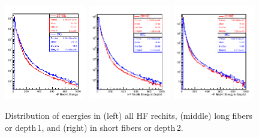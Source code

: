 \begin{figure}[h!]
\includegraphics[width=0.32\textwidth]{../Figures/Chap2/ImageFiles_HF/BasicPics/DataMC/HFEnergyDataMC}
\includegraphics[width=0.32\textwidth]{../Figures/Chap2/ImageFiles_HF/BasicPics/DataMC/ELDataMC}
\includegraphics[width=0.32\textwidth]{../Figures/Chap2/ImageFiles_HF/BasicPics/DataMC/ESDataMC}
\caption[HF rechit energy in data and MC]{Distribution of energies in (left) all HF rechits, (middle) long fibers or depth\,1, and (right) in short fibers or depth\,2.}
\label{fig:HFEnergyDataMC}
\end{figure}

